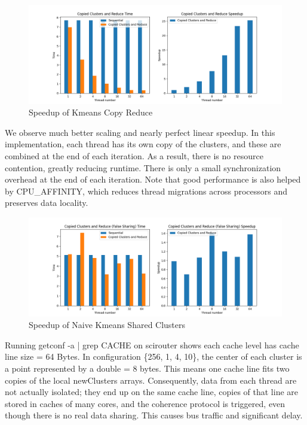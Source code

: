 \documentclass{article}
\newcommand{\eng}[1]{#1}
\begin{document}
\begin{figure}[h]
    \centering
    \includegraphics[width=\textwidth]{a2/plots/kmeans_copy_reduce_time_speedup.png}
    \caption{\eng{Speedup} of \eng{Kmeans Copy Reduce}}
    \label{kmeans_copy_reduce_time_speedup}
\end{figure}
\FloatBarrier

We observe much better scaling and nearly perfect linear \eng{speedup}. In this implementation, each thread has its own copy of the \eng{clusters}, and these are combined at the end of each iteration. As a result, there is no resource contention, greatly reducing runtime. There is only a small synchronization \eng{overhead} at the end of each iteration. Note that good performance is also helped by \eng{CPU\_AFFINITY}, which reduces thread migrations across processors and preserves data locality.

\begin{figure}[h]
    \centering
    \includegraphics[width=\textwidth]{a2/plots/kmeans_copy_reduce_time_speedup_false_sharing.png}
    \caption{\eng{Speedup} of \eng{Naive Kmeans Shared Clusters}}
    \label{fig:kmeans-naive-shared-clusters-false-sharing}
\end{figure}

Running \eng{getconf -a | grep CACHE} on \eng{scirouter} shows each cache level has \eng{cache line size} = 64 \eng{Bytes}. In configuration \eng{\{256, 1, 4, 10\}}, the center of each \eng{cluster} is a point represented by a \eng{double = 8 bytes}. This means one cache line fits two copies of the \eng{local newClusters} arrays. Consequently, data from each thread are not actually isolated; they end up on the same cache line, copies of that line are stored in caches of many cores, and the coherence protocol is triggered, even though there is no real data sharing. This causes bus traffic and significant delay.
\end{document}
